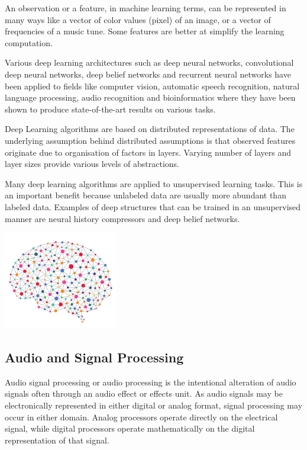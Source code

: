 \documentclass[12pt]{article}
\begin{document}
			\begin{justify}
				An observation or a feature, in machine learning terms, can be represented in many ways like a vector of color values (pixel) of an image, or a vector of frequencies of a music tune. Some features are better at simplify the learning computation.
			\end{justify}
			
			\begin{justify}
				Various deep learning architectures such as deep neural networks, convolutional deep neural networks, deep belief networks and recurrent neural networks have been applied to fields like computer vision, automatic speech recognition, natural language processing, audio recognition and bioinformatics where they have been shown to produce state-of-the-art results on various tasks.
			\end{justify}
			
			\begin{justify}
				Deep Learning algorithms are based on distributed representations of data. The underlying assumption behind distributed assumptions is that observed features originate due to organisation of factors in layers. Varying number of layers and layer sizes provide various levels of abstractions. 
			\end{justify}
			
			\begin{justify}
				Many deep learning algorithms are applied to unsupervised learning tasks. This is an important benefit because unlabeled data are usually more abundant than labeled data. Examples of deep structures that can be trained in an unsupervised manner are neural history compressors and deep belief networks.
			\end{justify}
			\begin{center}
				\includegraphics[width=5cm]{dl}
			\end{center}
		\subsection{Audio and Signal Processing}
	\begin{justify}
		Audio signal processing or audio processing is the intentional alteration of audio signals often through an audio effect or effects unit. As audio signals may be electronically represented in either digital or analog format, signal processing may occur in either domain. Analog processors operate directly on the electrical signal, while digital processors operate mathematically on the digital representation of that signal.
	\end{justify}
\end{document}
